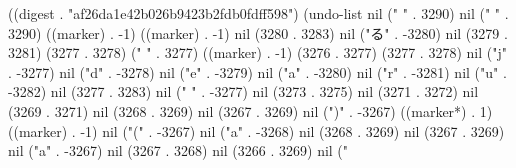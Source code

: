 
((digest . "af26da1e42b026b9423b2fdb0fdff598") (undo-list nil (" " . 3290) nil ("
" . 3290) ((marker) . -1) ((marker) . -1) nil (3280 . 3283) nil ("る" . -3280) nil (3279 . 3281) (3277 . 3278) (" " . 3277) ((marker) . -1) (3276 . 3277) (3277 . 3278) nil ("j" . -3277) nil ("d" . -3278) nil ("e" . -3279) nil ("a" . -3280) nil ("r" . -3281) nil ("u" . -3282) nil (3277 . 3283) nil (" " . -3277) nil (3273 . 3275) nil (3271 . 3272) nil (3269 . 3271) nil (3268 . 3269) nil (3267 . 3269) nil (")" . -3267) ((marker*) . 1) ((marker) . -1) nil ("(" . -3267) nil ("a" . -3268) nil (3268 . 3269) nil (3267 . 3269) nil ("a" . -3267) nil (3267 . 3268) nil (3266 . 3269) nil ("%
